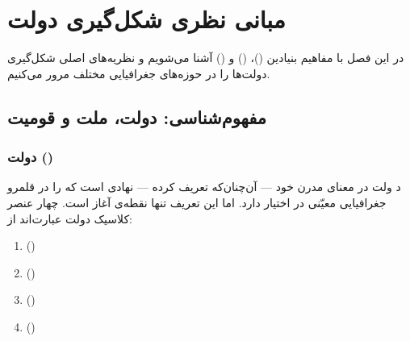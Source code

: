 
\chapter{مبانی نظری شکل‌گیری دولت}

\begin{keybox}
در این فصل با مفاهیم بنیادین  ()،  ()
و  () آشنا می‌شویم و نظریه‌های اصلی شکل‌گیری دولت‌ها را
در حوزه‌های جغرافیایی مختلف مرور می‌کنیم.
\end{keybox}

\section{مفهوم‌شناسی: دولت، ملت و قومیت}

\subsection{دولت ()}

\lettrine[lines=2, findent=3pt, nindent=0pt]{\textcolor{PrimaryDark}{د}}{}%
ولت در معنای مدرن خود — آن‌چنان‌که  تعریف کرده — نهادی است که
 را در قلمرو جغرافیایی معیّنی در اختیار دارد.
اما این تعریف تنها نقطه‌ی آغاز است. چهار عنصر کلاسیک دولت عبارت‌اند از:

\begin{enumerate}
  \item {} ()
  \item {} ()
  \item {} ()
  \item {} ()
\end{enumerate}

